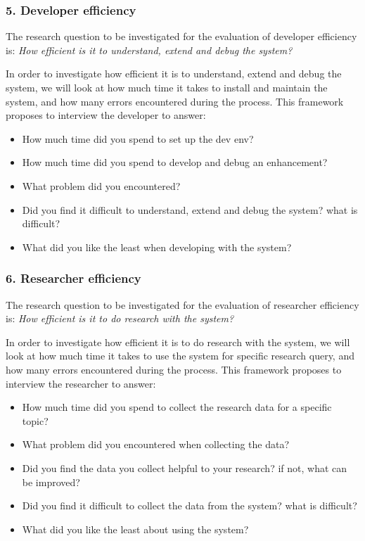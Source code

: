 \documentclass{sigchi}
\begin{document}
\subsubsection{5. Developer efficiency}
The research question to be investigated for the evaluation of developer efficiency is: \emph{How efficient is it to understand, extend and debug the system?}

In order to investigate how efficient it is to understand, extend and debug the system, we will look at how much time it takes to install and maintain the system, and how many errors encountered during the process. This framework proposes to interview the developer to answer:
\begin{itemize}
\item How much time did you spend to set up the dev env?
\item How much time did you spend to develop and debug an enhancement?
\item What problem did you encountered?
\item Did you find it difficult to understand, extend and debug the system? what is difficult?
\item What did you like the least when developing with the system?
\end{itemize}

\subsubsection{6. Researcher efficiency}
The research question to be investigated for the evaluation of researcher efficiency is: \emph{How efficient is it to do research with the system?}

In order to investigate how efficient it is to do research with the system, we will look at how much time it takes to use the system for specific research query, and how many errors encountered during the process. This framework proposes to interview the researcher to answer:
\begin{itemize}
\item How much time did you spend to collect the research data for a specific topic?
\item What problem did you encountered when collecting the data?
\item Did you find the data you collect helpful to your research? if not, what can be improved?
\item Did you find it difficult to collect the data from the system? what is difficult?
\item What did you like the least about using the system?
\end{itemize}
\end{document}
